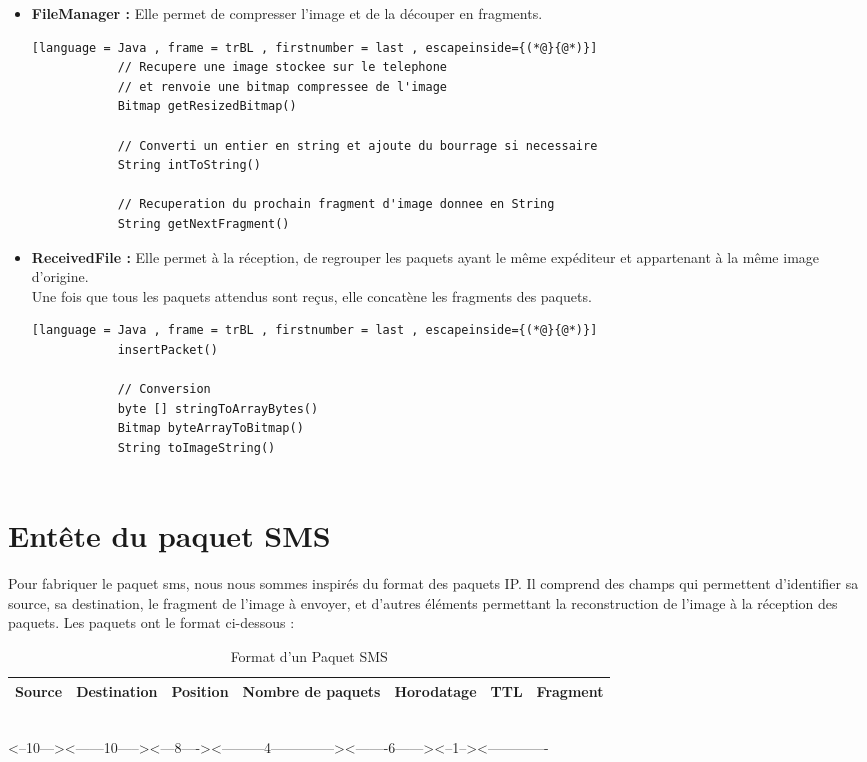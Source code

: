 \begin{itemize}
            \item \textbf{FileManager :} Elle permet de compresser l'image et de la découper en fragments.
            \begin{lstlisting}[language = Java , frame = trBL , firstnumber = last , escapeinside={(*@}{@*)}]
            // Recupere une image stockee sur le telephone
            // et renvoie une bitmap compressee de l'image
            Bitmap getResizedBitmap()
            
            // Converti un entier en string et ajoute du bourrage si necessaire
            String intToString()
            
            // Recuperation du prochain fragment d'image donnee en String
            String getNextFragment()
            \end{lstlisting}
            \vspace{0.2cm}
            
            \item \textbf{ReceivedFile :} Elle permet à la réception, de regrouper les paquets ayant le même expéditeur et appartenant à la même image d'origine.\\
            Une fois que tous les paquets attendus sont reçus, elle concatène les fragments des paquets.  
            
            \begin{lstlisting}[language = Java , frame = trBL , firstnumber = last , escapeinside={(*@}{@*)}]
            insertPacket()
            
            // Conversion
            byte [] stringToArrayBytes()
            Bitmap byteArrayToBitmap()
            String toImageString()
            
            \end{lstlisting}
        \end{itemize}
        
        \section{Entête du paquet SMS }\label{epSMS}
        Pour fabriquer le paquet sms, nous nous sommes inspirés du format des paquets IP. Il comprend des champs qui permettent d'identifier sa source, sa destination, le fragment de l'image à envoyer, et d'autres éléments permettant la reconstruction de l'image à la réception des paquets. Les paquets ont le format ci-dessous : 
        
        \begin{table}[htbp]
          \begin{tabular}{|c|*{6}{c|}}
             \hline
             Source & Destination & Position & Nombre de paquets & Horodatage & TTL & Fragment  \\
             \hline
        \end{tabular} \\
        <--10---><------10-----><---8----><---------4--------------><-------6------><--1--><-------------
            \caption{Format d'un Paquet SMS}
            \label{tab:my_label}
        \end{table}
        
